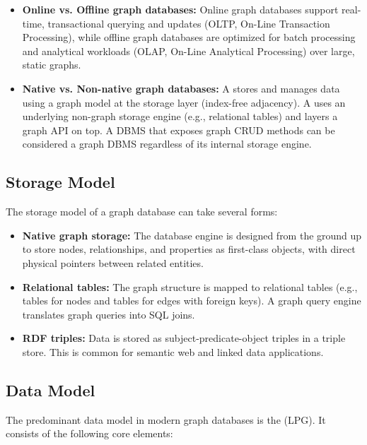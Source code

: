 \begin{itemize}
    \item \textbf{Online vs. Offline graph databases:} Online graph databases support real-time, transactional querying and updates (OLTP, On-Line Transaction Processing), while offline graph databases are optimized for batch processing and analytical workloads (OLAP, On-Line Analytical Processing) over large, static graphs.
    \item \textbf{Native vs. Non-native graph databases:} A  stores and manages data using a graph model at the storage layer (index-free adjacency). A  uses an underlying non-graph storage engine (e.g., relational tables) and layers a graph API on top. A DBMS that exposes graph CRUD methods can be considered a graph DBMS regardless of its internal storage engine.
\end{itemize}

\subsection{Storage Model}

The storage model of a graph database can take several forms:

\begin{itemize}
    \item \textbf{Native graph storage:} The database engine is designed from the ground up to store nodes, relationships, and properties as first-class objects, with direct physical pointers between related entities.
    \item \textbf{Relational tables:} The graph structure is mapped to relational tables (e.g., tables for nodes and tables for edges with foreign keys). A graph query engine translates graph queries into SQL joins.
    \item \textbf{RDF triples:} Data is stored as subject-predicate-object triples in a triple store. This is common for semantic web and linked data applications.
\end{itemize}

\subsection{Data Model}

The predominant data model in modern graph databases is the  (LPG). It consists of the following core elements:

